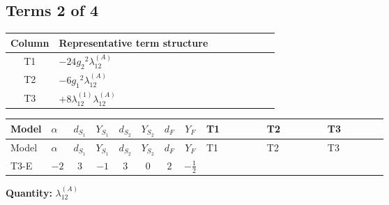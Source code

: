 \documentclass[8pt]{article}
\begin{document}
\begin{landscape}
\subsection*{Terms 2 of 4}
\begin{center}
\begin{tabular}{@{}c >{\raggedright\arraybackslash}p{0.82\linewidth}@{}}
\toprule
Column & Representative term structure \\
\midrule
T1 & \(\displaystyle -24 {g_2}^2 {\lambda_{12}^{(A)}}\) \\
\midrule
T2 & \(\displaystyle -6 {g_1}^2 {\lambda_{12}^{(A)}}\) \\
\midrule
T3 & \(\displaystyle +8 {\lambda_{12}^{(1)}} {\lambda_{12}^{(A)}}\) \\
\midrule
\bottomrule
\end{tabular}
\end{center}
\smallskip
\tiny
\begin{longtable}{@{}llcccccc >{\raggedright\arraybackslash}p{0.21\linewidth} >{\raggedright\arraybackslash}p{0.21\linewidth} >{\raggedright\arraybackslash}p{0.21\linewidth}@{}}
\toprule
Model & $\alpha$ & $d_{S_1}$ & $Y_{S_1}$ & $d_{S_2}$ & $Y_{S_2}$ & $d_F$ & $Y_F$ & T1 & T2 & T3 \\
\midrule
\endfirsthead
\toprule
Model & $\alpha$ & $d_{S_1}$ & $Y_{S_1}$ & $d_{S_2}$ & $Y_{S_2}$ & $d_F$ & $Y_F$ & T1 & T2 & T3 \\
\midrule
\endhead
T3-E & $-2$ & $3$ & $-1$ & $3$ & $0$ & $2$ & $-\frac{1}{2}$ & \scriptsize\adjustbox{max width=\linewidth}{$\begin{gathered} -24 {g_2}^2 {\lambda_{12}^{(A)}}\end{gathered}$} & \scriptsize\adjustbox{max width=\linewidth}{$\begin{gathered} -6 {g_1}^2 {\lambda_{12}^{(A)}}\end{gathered}$} & \scriptsize\adjustbox{max width=\linewidth}{$\begin{gathered} +8 {\lambda_{12}^{(1)}} {\lambda_{12}^{(A)}}\end{gathered}$} \\
\midrule
\bottomrule
\end{longtable}
\clearpage
\noindent\textbf{Quantity: }$\lambda_{12}^{(A)}$\par\smallskip

\end{landscape}
\end{document}
